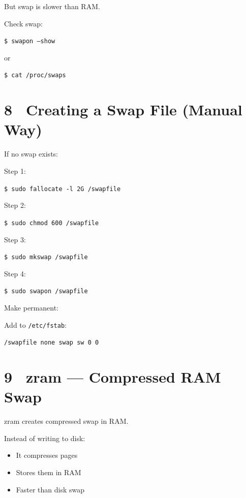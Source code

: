\documentclass[12pt]{article}
\newcommand{\zramicon}{\faCompress}        %
\begin{document}
But swap is slower than RAM.

Check swap:

\begin{highlightbox}
\texttt{\$ swapon --show}
\end{highlightbox}

or

\begin{highlightbox}
\texttt{\$ cat /proc/swaps}
\end{highlightbox}

\section*{8 \faFile\ Creating a Swap File (Manual Way)}

If no swap exists:

Step 1:

\begin{highlightbox}
\texttt{\$ sudo fallocate -l 2G /swapfile}
\end{highlightbox}

Step 2:

\begin{highlightbox}
\texttt{\$ sudo chmod 600 /swapfile}
\end{highlightbox}

Step 3:

\begin{highlightbox}
\texttt{\$ sudo mkswap /swapfile}
\end{highlightbox}

Step 4:

\begin{highlightbox}
\texttt{\$ sudo swapon /swapfile}
\end{highlightbox}

Make permanent:

Add to \texttt{/etc/fstab}:

\begin{highlightbox}
\texttt{/swapfile none swap sw 0 0}
\end{highlightbox}

\section*{9 \zramicon\ zram — Compressed RAM Swap}

zram creates compressed swap in RAM.

Instead of writing to disk:

\begin{itemize}
    \item It compresses pages
    \item Stores them in RAM
    \item Faster than disk swap
\end{itemize}
\end{document}
